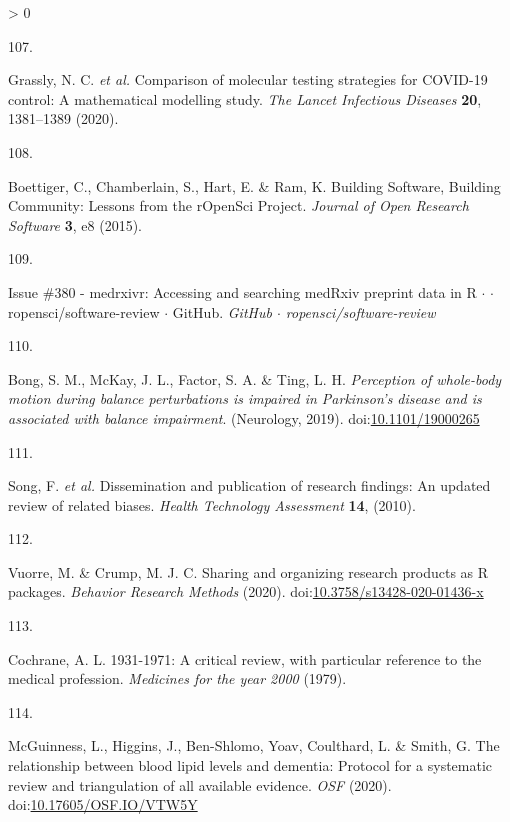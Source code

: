 \documentclass[a4paper, twoside]{templates/ociamthesis}
\newlength{\cslhangindent}
\newlength{\csllabelwidth}
\newenvironment{CSLReferences}[3] %
 {%
  \setlength{\parindent}{0pt}
  \ifodd #1 \everypar{\setlength{\hangindent}{\cslhangindent}}\ignorespaces\fi
  \ifnum #2 > 0
  \setlength{\parskip}{#2\baselineskip}
  \fi
 }%
 {}
\newcommand{\CSLLeftMargin}[1]{\parbox[t]{\maxof{\widthof{#1}}{\csllabelwidth}}{#1}}
\newcommand{\CSLRightInline}[1]{\parbox[t]{\linewidth - \csllabelwidth}{#1}}
\begin{document}
\begin{CSLReferences}{0}{0}
\leavevmode\hypertarget{ref-grassly2020}{}%
\CSLLeftMargin{107. }
\CSLRightInline{Grassly, N. C. \emph{et al.} Comparison of molecular testing strategies for {COVID}-19 control: A mathematical modelling study. \emph{The Lancet Infectious Diseases} \textbf{20}, 1381--1389 (2020).}

\leavevmode\hypertarget{ref-boettiger2015}{}%
\CSLLeftMargin{108. }
\CSLRightInline{Boettiger, C., Chamberlain, S., Hart, E. \& Ram, K. Building {Software}, {Building Community}: {Lessons} from the {rOpenSci Project}. \emph{Journal of Open Research Software} \textbf{3}, e8 (2015).}

\leavevmode\hypertarget{ref-zotero-15016}{}%
\CSLLeftMargin{109. }
\CSLRightInline{Issue \#380 - medrxivr: {Accessing} and searching {medRxiv} preprint data in {R} {\(\cdot\)} {\(\cdot\)} ropensci/software-review {\(\cdot\)} {GitHub}. \emph{GitHub {\(\cdot\)} ropensci/software-review}}

\leavevmode\hypertarget{ref-bong2019}{}%
\CSLLeftMargin{110. }
\CSLRightInline{Bong, S. M., McKay, J. L., Factor, S. A. \& Ting, L. H. \emph{Perception of whole-body motion during balance perturbations is impaired in {Parkinson}'s disease and is associated with balance impairment}. ({Neurology}, 2019). doi:\href{https://doi.org/10.1101/19000265}{10.1101/19000265}}

\leavevmode\hypertarget{ref-song2010}{}%
\CSLLeftMargin{111. }
\CSLRightInline{Song, F. \emph{et al.} Dissemination and publication of research findings: An updated review of related biases. \emph{Health Technology Assessment} \textbf{14}, (2010).}

\leavevmode\hypertarget{ref-vuorre2020}{}%
\CSLLeftMargin{112. }
\CSLRightInline{Vuorre, M. \& Crump, M. J. C. Sharing and organizing research products as {R} packages. \emph{Behavior Research Methods} (2020). doi:\href{https://doi.org/10.3758/s13428-020-01436-x}{10.3758/s13428-020-01436-x}}

\leavevmode\hypertarget{ref-cochrane1979}{}%
\CSLLeftMargin{113. }
\CSLRightInline{Cochrane, A. L. 1931-1971: A critical review, with particular reference to the medical profession. \emph{Medicines for the year 2000} (1979).}

\leavevmode\hypertarget{ref-mcguinnessluke2020}{}%
\CSLLeftMargin{114. }
\CSLRightInline{McGuinness, L., Higgins, J., Ben-Shlomo, Yoav, Coulthard, L. \& Smith, G. The relationship between blood lipid levels and dementia: Protocol for a systematic review and triangulation of all available evidence. \emph{OSF} (2020). doi:\href{https://doi.org/10.17605/OSF.IO/VTW5Y}{10.17605/OSF.IO/VTW5Y}}


\end{CSLReferences}
\end{document}
